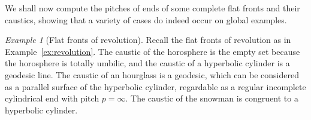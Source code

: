 \documentclass[a4paper]{amsart}
\theoremstyle{plain}
\theoremstyle{remark}
\newtheorem{example}[theorem]{Example}
\numberwithin{equation}{section}
\begin{document}
We shall now compute the pitches of ends of some complete flat 
fronts and their caustics, showing that a variety of cases do 
indeed occur on global examples.  

\begin{example}[Flat fronts of revolution]
\label{exa:revolution}
 Recall the flat fronts of revolution as in Example~\ref{ex:revolution}.
 The caustic of the horosphere is the empty set because 
 the horosphere is totally umbilic,
 and the caustic of a hyperbolic cylinder is a geodesic line.
 The caustic of an hourglass is a geodesic, which
 can be considered as a parallel surface of 
 the hyperbolic cylinder, regardable
 as a regular incomplete cylindrical end with pitch $p=\infty$.
 The caustic of the snowman is congruent to
 a hyperbolic cylinder. 
\end{example}
\end{document}
